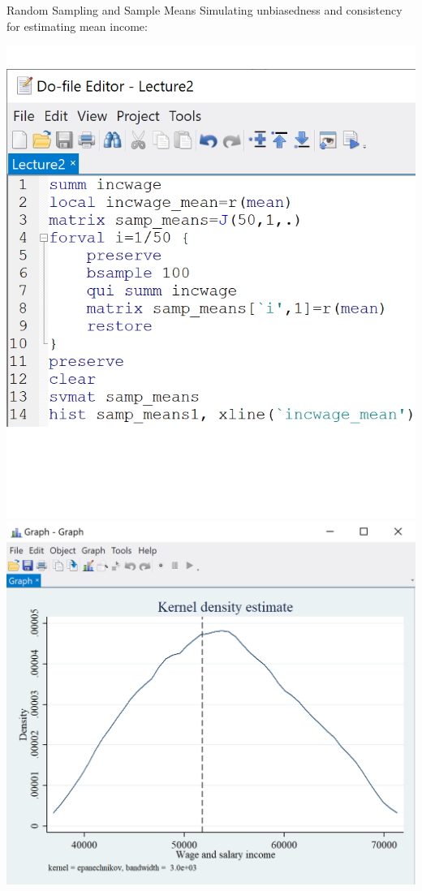 \documentclass[11pt,english,handout]{beamer}
\begin{document}
\begin{frame}{Random Sampling and Sample Means}
\vspace{0.2cm}
Simulating unbiasedness and consistency for estimating mean income:

\begin{center}
\includegraphics[scale=0.45]{stata18.png} \includegraphics[scale=0.5]{stata22.png}
\end{center}

\end{frame}
\end{document}
